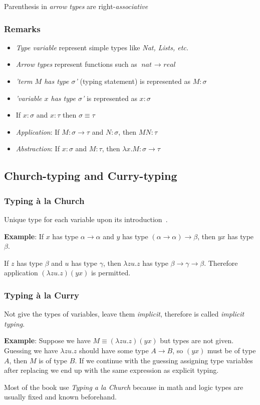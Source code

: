 \documentclass[12pt, a4paper]{article}
\newcommand{\ra}{\rightarrow}
\begin{document}
Parenthesis in \textit{arrow types} are right-\textit{associative}

\subsubsection{Remarks}
\begin{itemize}
    \item \textit{Type variable} represent simple types like \textit{Nat, Lists, etc.}
    \item \textit{Arrow types} represent functions such as $\textit{nat } \ra \textit{ real}$
    \item \textit{'term $M$ has type $\sigma$'} (typing statement) is represented as $M : \sigma$
    \item \textit{'variable $x$ has type $\sigma$'} is represented as $x : \sigma$
    \item If $x : \sigma$ and $x : \tau$ then $\sigma \equiv \tau$
    \item \textit{Application}: If $M : \sigma \ra \tau$ and $N : \sigma$, then $MN : \tau$ 
    \item \textit{Abstraction}: If $x : \sigma$ and $M : \tau$, then $\lambda x. M : \sigma \ra \tau$ 
\end{itemize}

\subsection{Church-typing and Curry-typing}
\subsubsection{Typing à la Church}
Unique type for each variable upon its introduction~\cite{church}.

\textbf{Example}: If $x$ has type $\alpha \ra \alpha$ and $y$ has type $(\alpha \ra \alpha) \ra \beta$, then $yx$ has type $\beta$.

If $z$ has type $\beta$ and $u$ has type $\gamma$, then $\lambda zu.z$ has type $\beta \ra \gamma \ra \beta$.
Therefore application $(\lambda zu.z)(yx)$ is permitted.

\subsubsection{Typing à la Curry}
Not give the types of variables, leave them \textit{implicit}, therefore is called \textit{implicit typing}.

\textbf{Example}: Suppose we have $M \equiv (\lambda zu.z)(yx)$ but types are not given. 
Guessing we have $\lambda zu.z$ should have some type $A \ra B$, so $(yx)$ must be of type $A$, then $M$ is of type $B$.
If we continue with the guessing assigning type variables after replacing we end up with the same expression as explicit typing.

Most of the book use \textit{Typing a la Church} because in math and logic types are usually fixed and known beforehand.



\end{document}
